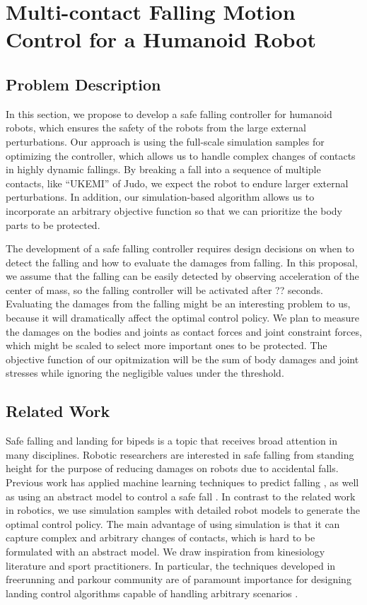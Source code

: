\section{Multi-contact Falling Motion Control for a Humanoid Robot}

\subsection{Problem Description}

In this section, we propose to develop a safe falling controller for 
humanoid robots, which ensures the safety of the robots from the
large external perturbations.
Our approach is using the full-scale simulation samples for optimizing 
the controller, which allows us to handle complex changes of contacts 
in highly dynamic fallings.
By breaking a fall into a sequence of multiple contacts, like ``UKEMI'' of Judo,
we expect the robot to endure larger external perturbations.
In addition, our simulation-based algorithm allows us to incorporate
an arbitrary objective function so that we can prioritize the body parts
to be protected.

The development of a safe falling controller requires design decisions
on when to detect the falling and how to evaluate the damages from falling.
In this proposal, we assume that the falling can be easily detected 
by observing acceleration of the center of mass, so the 
falling controller will be activated after ?? seconds.
Evaluating the damages from the falling might be an interesting problem
to us, because it will dramatically affect the optimal control policy.
We plan to measure the damages on the bodies and joints
as contact forces and joint constraint forces, which might be
scaled to select more important ones to be protected.
The objective function of our opitmization will be the sum of body
damages and joint stresses while ignoring the negligible values
under the threshold.

\subsection{Related Work}

Safe falling and landing for bipeds is a topic that
receives broad attention in many disciplines. Robotic researchers are
interested in safe falling from standing height for the purpose of
reducing damages on robots due to accidental falls. Previous work has
applied machine learning techniques to predict falling
\cite{Kalyanakrishnan:2011:LPH}, as well as using an abstract model to
control a safe fall
\cite{Fujiwara:2002:FMC,Fujiwara:2007:OPF,Yun:2009:SFH}. 
In contrast to the related work in robotics, we use simulation samples
with detailed robot models to generate the optimal control policy.
The main advantage of using simulation is that it can capture
complex and arbitrary changes of contacts, which is hard to be 
formulated with an abstract model.
We draw inspiration from kinesiology literature and sport practitioners. 
In particular, the techniques developed in freerunning and parkour 
community are of paramount importance for designing landing control 
algorithms capable of handling arbitrary scenarios
\cite{Edwardes:2009:TPF,HLJ:2011:URL}. 


